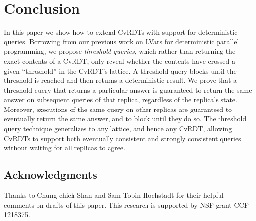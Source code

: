 \section{Conclusion}

In this paper we show how to extend CvRDTs with support for
deterministic queries.  Borrowing from our previous work on LVars for
deterministic parallel programming, we propose \emph{threshold
  queries}, which rather than returning the exact contents of a CvRDT,
only reveal whether the contents have crossed a given ``threshold'' in
the CvRDT's lattice.  A threshold query blocks until the threshold is
reached and then returns a deterministic result.  We prove that a
threshold query that returns a particular answer is guaranteed to
return the same answer on subsequent queries of that replica,
regardless of the replica's state.  Moreover, executions of the same
query on other replicas are guaranteed to eventually return the same
answer, and to block until they do so.  The threshold query technique
generalizes to any lattice, and hence any CvRDT, allowing CvRDTs to
support both eventually consistent and strongly consistent queries
without waiting for all replicas to agree.

\subsection*{Acknowledgments}

Thanks to Chung-chieh Shan and Sam Tobin-Hochstadt for their helpful
comments on drafts of this paper.  This research is supported by NSF
grant CCF-1218375.
\fi







 

